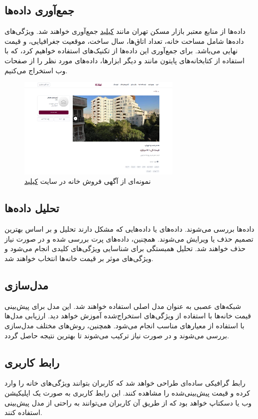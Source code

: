 \documentclass{article}
\begin{document}
\subsection{جمع‌آوری داده‌ها}
داده‌ها از منابع معتبر بازار مسکن تهران مانند \href{https://kilid.com/}{کیلید} جمع‌آوری خواهند شد. ویژگی‌های داده‌ها شامل مساحت خانه، تعداد اتاق‌ها، سال ساخت، موقعیت جغرافیایی، و قیمت نهایی می‌باشد. برای جمع‌آوری این داده‌ها از تکنیک‌های  استفاده خواهیم کرد، که با استفاده از کتابخانه‌های پایتون مانند  و دیگر ابزارها، داده‌های مورد نظر را از صفحات وب استخراج می‌کنیم.

\begin{figure}
    \centering
    \includegraphics[width=0.7\textwidth]{img/sample-ad.png}
    \caption{نمونه‌ای از آگهی فروش خانه در سایت \href{https://kilid.com/}{کیلید}}
    \label{fig:sample-ad}
\end{figure}

\subsection{تحلیل داده‌ها}
داده‌ها بررسی می‌شوند. داده‌های  یا داده‌هایی که مشکل دارند تحلیل و بر اساس بهترین تصمیم حذف یا ویرایش می‌شوند. همچنین، داده‌های پرت بررسی شده و در صورت نیاز حذف خواهند شد. تحلیل همبستگی برای شناسایی ویژگی‌های کلیدی انجام می‌شود و ویژگی‌های موثر بر قیمت خانه‌ها انتخاب خواهند شد.

\subsection{مدل‌سازی}
شبکه‌های عصبی به عنوان مدل اصلی استفاده خواهند شد. این مدل برای پیش‌بینی قیمت خانه‌ها با استفاده از ویژگی‌های استخراج‌شده آموزش خواهد دید. ارزیابی مدل‌ها با استفاده از معیارهای مناسب انجام می‌شود. همچنین، روش‌های مختلف مدل‌سازی بررسی می‌شوند و در صورت نیاز ترکیب می‌شوند تا بهترین نتیجه حاصل گردد.

\subsection{رابط کاربری}
رابط گرافیکی ساده‌ای طراحی خواهد شد که کاربران بتوانند ویژگی‌های خانه را وارد کرده و قیمت پیش‌بینی‌شده را مشاهده کنند. این رابط کاربری به صورت یک اپلیکیشن وب یا دسکتاپ خواهد بود که از طریق آن کاربران می‌توانند به راحتی از مدل پیش‌بینی استفاده کنند.
\end{document}
